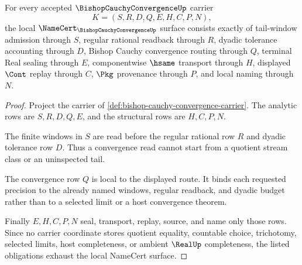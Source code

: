 \begin{theorem}
\label{thm:bishop-cauchy-convergence-namecert-obligations}
For every accepted $\BishopCauchyConvergenceUp$ carrier
$$
K=(S,R,D,Q,E,H,C,P,N),
$$
the local $\NameCert_{\BishopCauchyConvergenceUp}$ surface consists exactly of tail-window admission through $S$, regular rational readback through $R$, dyadic tolerance accounting through $D$, Bishop Cauchy convergence routing through $Q$, terminal Real sealing through $E$, componentwise $\hsame$ transport through $H$, displayed $\Cont$ replay through $C$, $\Pkg$ provenance through $P$, and local naming through $N$.
\end{theorem}
\begin{proof}
Project the carrier of \autoref{def:bishop-cauchy-convergence-carrier}. The analytic rows are $S,R,D,Q,E$, and the structural rows are $H,C,P,N$.

The finite windows in $S$ are read before the regular rational row $R$ and dyadic tolerance row $D$. Thus a convergence read cannot start from a quotient stream class or an uninspected tail.

The convergence row $Q$ is local to the displayed route. It binds each requested precision to the already named windows, regular readback, and dyadic budget rather than to a selected limit or a host convergence theorem.

Finally $E,H,C,P,N$ seal, transport, replay, source, and name only those rows. Since no carrier coordinate stores quotient equality, countable choice, trichotomy, selected limits, host completeness, or ambient $\RealUp$ completeness, the listed obligations exhaust the local NameCert surface.
\end{proof}


